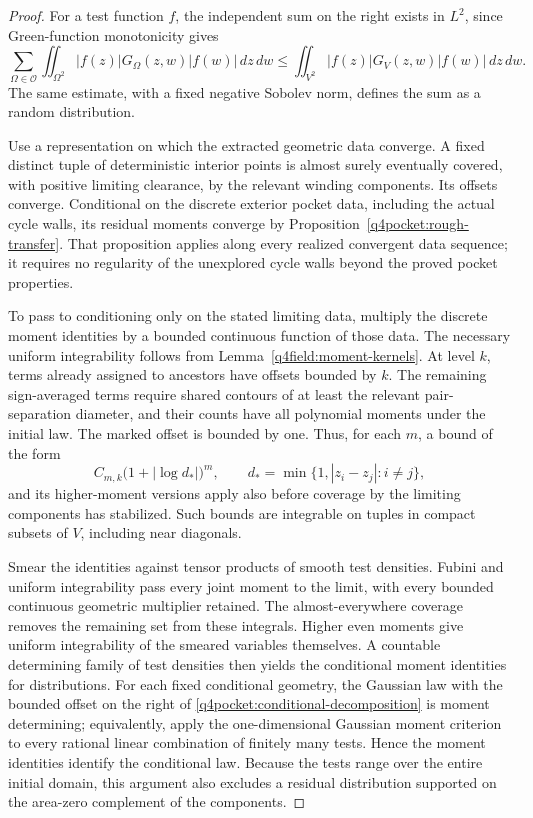 \begin{proof}
For a test function $f$, the independent sum on the right exists
in $L^2$, since Green-function monotonicity gives
\begin{equation}
 \sum_{\Omega\in\mathcal O}
 \iint_{\Omega^2}|f(z)|G_\Omega(z,w)|f(w)|\,dz\,dw
 \leq
 \iint_{V^2}|f(z)|G_V(z,w)|f(w)|\,dz\,dw.
 \label{q4pocket:covariance-domination}
\end{equation}
The same estimate, with a fixed negative Sobolev norm, defines the
sum as a random distribution.

Use a representation on which the extracted geometric data converge.
A fixed distinct tuple of deterministic interior points is almost
surely eventually covered, with positive limiting clearance, by the
relevant winding components.  Its offsets converge.  Conditional
on the discrete exterior pocket data, including the actual cycle
walls, its residual moments converge by
Proposition~\ref{q4pocket:rough-transfer}.  That proposition applies
along every realized convergent data sequence; it requires no
regularity of the unexplored cycle walls beyond the proved pocket
properties.

To pass to conditioning only on the stated limiting data, multiply
the discrete moment identities by a bounded continuous function of
those data.  The necessary uniform integrability follows from
Lemma~\ref{q4field:moment-kernels}.  At level $k$, terms already
assigned to ancestors have offsets bounded by $k$.  The remaining
sign-averaged terms require shared contours of at least the relevant
pair-separation diameter, and their counts have all polynomial
moments under the initial law.  The marked offset is bounded by
one.  Thus, for each $m$, a bound of the form
\[
 C_{m,k}\bigl(1+|\log d_*|\bigr)^m,
 \qquad
 d_* = \min\bigl\{1,|z_i-z_j|:i\ne j\bigr\},
\]
and its higher-moment versions apply also before coverage by the
limiting components has stabilized.  Such bounds are integrable
on tuples in compact subsets of $V$, including near diagonals.

Smear the identities against tensor products of smooth test
densities.  Fubini and uniform integrability pass every joint
moment to the limit, with every bounded continuous geometric
multiplier retained.  The almost-everywhere coverage removes the
remaining set from these integrals.  Higher even moments give
uniform integrability of the smeared variables themselves.
A countable determining family of test densities then yields the
conditional moment identities for distributions.  For each fixed
conditional geometry, the Gaussian law with the bounded offset
on the right of \eqref{q4pocket:conditional-decomposition} is
moment determining; equivalently, apply the one-dimensional
Gaussian moment criterion to every rational linear combination
of finitely many tests.  Hence the moment identities identify
the conditional law.  Because the tests range over the entire
initial domain, this argument also excludes a residual
distribution supported on the area-zero complement of the
components.
\end{proof}

